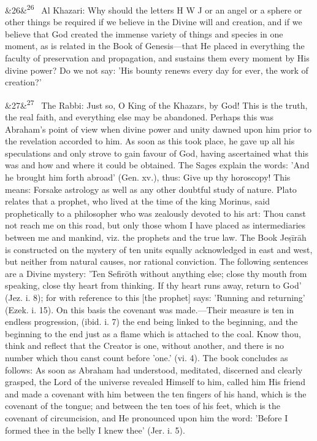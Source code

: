\documentclass[12pt]{article}
\newcommand{\para}[1][]{\par\noindent\ifx&#1&\else\textsuperscript{\footnotesize #1}~\fi}
\begin{document}
\para[26] Al Khazari: Why should the letters H W J or an angel or a sphere or other things be required if we believe in the Divine will and creation, and if we believe that God created the immense variety of things and species in one moment, as is related in the Book of Genesis---that He placed in everything the faculty of preservation and propagation, and sustains them every moment by His divine power? Do we not say: 'His bounty renews every day for ever, the work of creation?'

\para[27] The Rabbi: Just so, O King of the Khazars, by God! This is the truth, the real faith, and everything else may be abandoned. Perhaps this was Abraham's point of view when divine power and unity dawned upon him prior to the revelation accorded to him. As soon as this took place, he gave up all his speculations and only strove to gain favour of God, having ascertained what this was and how and where it could be obtained. The Sages explain the words: 'And he brought him forth abroad' (Gen. xv.), thus: Give up thy horoscopy! This means: Forsake astrology as well as any other doubtful study of nature. Plato relates that a prophet, who lived at the time of the king Morinus, said prophetically to a philosopher who was zealously devoted to his art: Thou canst not reach me on this road, but only those whom I have placed as intermediaries between me and mankind, viz. the prophets and the true law. The Book Jeṣīrāh is constructed on the mystery of ten units equally acknowledged in east and west, but neither from natural causes, nor rational conviction. The following sentences are a Divine mystery: 'Ten Sefirōth without anything else; close thy mouth from speaking, close thy heart from thinking. If thy heart runs away, return to God' (Jez. i. 8); for with reference to this [the prophet] says: 'Running and returning' (Ezek. i. 15). On this basis the covenant was made.---Their measure is ten in endless progression, (ibid. i. 7) the end being linked to the beginning, and the beginning to the end just as a flame which is attached to the coal. Know thou, think and reflect that the Creator is one, without another, and there is no number which thou canst count before 'one.' (vi. 4). The book concludes as follows: As soon as Abraham had understood, meditated, discerned and clearly grasped, the Lord of the universe revealed Himself to him, called him His friend and made a covenant with him between the ten fingers of his hand, which is the covenant of the tongue; and between the ten toes of his feet, which is the covenant of circumcision, and He pronounced upon him the word: 'Before I formed thee in the belly I knew thee' (Jer. i. 5).
\end{document}
